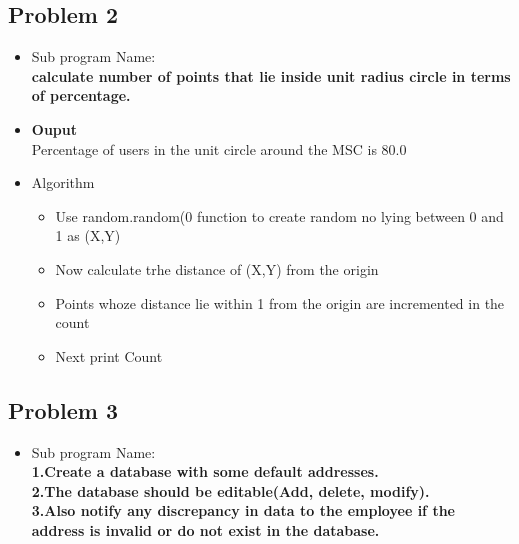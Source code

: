 \documentclass[12pt,a4paper]{article}
\begin{document}
{{{\begin{itemize}
\begin{itemize}
\end{itemize}


\end{itemize}
\newpage

\subsection{Problem 2}
\begin{itemize}


\item{Sub program Name:}\\
\textbf{ calculate number of points that lie inside unit radius circle in terms of percentage.
}

\bigskip

\bigskip
 
 

\item{\textbf{Ouput}}\\
Percentage of users in the unit circle around the MSC is 80.0





\item{Algorithm}
\begin{itemize}
\item{ Use random.random(0 function to create random no lying between 0 and 1 as (X,Y)}
\item{ Now calculate trhe distance of (X,Y) from the origin}
\item{ Points whoze distance lie within 1 from the origin are incremented in the count}
\item{ Next print Count} 

\end{itemize}
\end{itemize}
\newpage
\subsection{Problem 3}
\begin{itemize}


\item{Sub program Name:}\\
\textbf{1.Create a database with some default addresses.\\
2.The database should be editable(Add, delete, modify).\\
3.Also notify any discrepancy in data to the employee if the address is invalid or do not exist in the database.\\
}


\end{itemize}}}}
\end{document}
